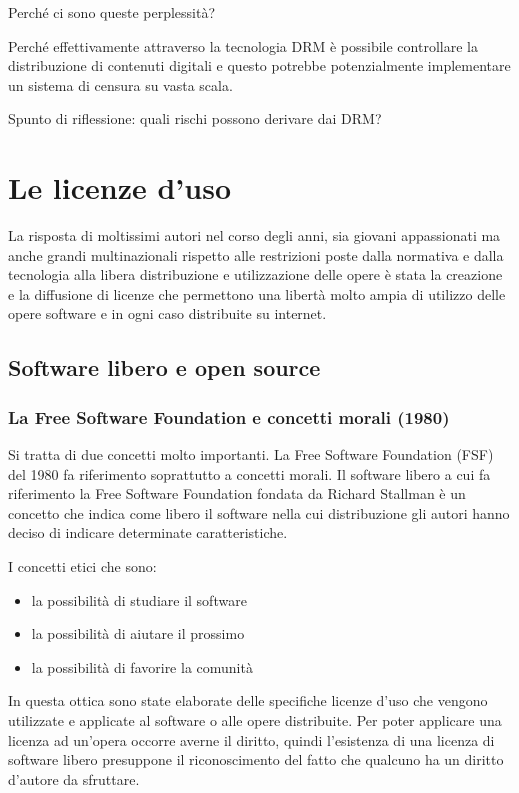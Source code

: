 Perché ci sono queste perplessità? 

Perché effettivamente attraverso la tecnologia DRM è possibile controllare la distribuzione di contenuti digitali e questo potrebbe potenzialmente implementare un sistema di censura su vasta scala. 

Spunto di riflessione: quali rischi possono derivare dai DRM? 

\section{Le licenze d'uso}

La risposta di moltissimi autori nel corso degli anni, sia giovani appassionati ma anche grandi multinazionali rispetto alle restrizioni poste dalla normativa e dalla tecnologia alla libera distribuzione e utilizzazione delle opere è stata la creazione e la diffusione di licenze che permettono una libertà molto ampia di utilizzo delle opere software e in ogni caso distribuite su internet.

\subsection{Software libero e open source}
\subsubsection{La Free Software Foundation e concetti morali (1980)}
Si tratta di due concetti molto importanti. La Free Software Foundation (FSF) del 1980 fa riferimento soprattutto a concetti morali. 
Il software libero a cui fa riferimento la Free Software Foundation fondata da Richard Stallman è un concetto che indica come libero il software nella cui distribuzione gli autori hanno deciso di indicare determinate caratteristiche. 

I concetti etici che sono:

\begin{itemize}
    \item la possibilità di studiare il software
    \item la possibilità di aiutare il prossimo
    \item la possibilità di favorire la comunità
\end{itemize}

In questa ottica sono state elaborate delle specifiche licenze d'uso che vengono utilizzate e applicate al software o alle opere distribuite. 
Per poter applicare una licenza ad un'opera occorre averne il diritto, quindi l'esistenza di una licenza di software libero presuppone il riconoscimento del fatto che qualcuno ha un diritto d'autore da sfruttare.

